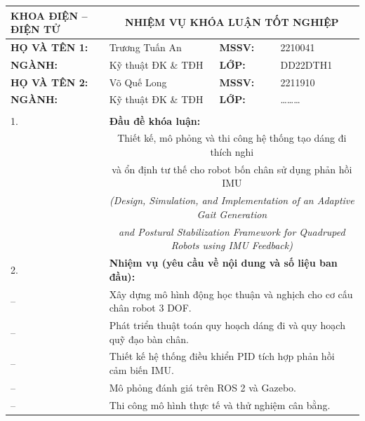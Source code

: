 \documentclass[13pt,a4paper,oneside]{extbook}
\begin{document}
{\setlength{\tabcolsep}{4pt}
\renewcommand{\arraystretch}{1.3}
\noindent
\begin{tabular}{|p{}|p{}|p{}|p{}|p{}|}
\hline
\multicolumn{2}{|l|}{\textbf{KHOA ĐIỆN -- ĐIỆN TỬ}} &
\multicolumn{3}{c|}{\fontsize{13pt}{15.6pt}\selectfont \textbf{NHIỆM VỤ KHÓA LUẬN TỐT NGHIỆP}} \\
\hline
\multicolumn{2}{|l|}{\textbf{HỌ VÀ TÊN 1:}} & Trương Tuấn An & \textbf{MSSV:} & 2210041 \\
\hline
\multicolumn{2}{|l|}{\textbf{NGÀNH:}} & Kỹ thuật ĐK \& TĐH & \textbf{LỚP:} & DD22DTH1 \\
\hline
\multicolumn{2}{|l|}{\textbf{HỌ VÀ TÊN 2:}} & Võ Quế Long & \textbf{MSSV:} & 2211910 \\
\hline
\multicolumn{2}{|l|}{\textbf{NGÀNH:}} & Kỹ thuật ĐK \& TĐH & \textbf{LỚP:} & \dots\dots\dots \\
\hline
\multicolumn{5}{|l|}{} \\
\hline
1. & \multicolumn{4}{l|}{\textbf{Đầu đề khóa luận:}} \\
& \multicolumn{4}{c|}{Thiết kế, mô phỏng và thi công hệ thống tạo dáng đi thích nghi} \\
& \multicolumn{4}{c|}{và ổn định tư thế cho robot bốn chân sử dụng phản hồi IMU} \\
& \multicolumn{4}{c|}{\textit{(Design, Simulation, and Implementation of an Adaptive Gait Generation}} \\
& \multicolumn{4}{c|}{\textit{and Postural Stabilization Framework for Quadruped Robots using IMU Feedback)}} \\
\hline
2. & \multicolumn{4}{l|}{\textbf{Nhiệm vụ (yêu cầu về nội dung và số liệu ban đầu):}} \\
\hline
-- & \multicolumn{4}{l|}{Xây dựng mô hình động học thuận và nghịch cho cơ cấu chân robot 3 DOF.} \\
\hline
-- & \multicolumn{4}{l|}{Phát triển thuật toán quy hoạch dáng đi và quy hoạch quỹ đạo bàn chân.} \\
\hline
-- & \multicolumn{4}{l|}{Thiết kế hệ thống điều khiển PID tích hợp phản hồi cảm biến IMU.} \\
\hline
-- & \multicolumn{4}{l|}{Mô phỏng đánh giá trên ROS 2 và Gazebo.} \\
\hline
-- & \multicolumn{4}{l|}{Thi công mô hình thực tế và thử nghiệm cân bằng.} \\

\end{tabular}}
\end{document}
